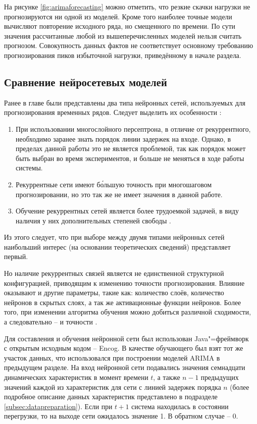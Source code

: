\documentclass[a4paper,14pt,russian]{extreport}
\begin{document}
\newpage
На рисунке \ref{fig:arimaforecasting} можно отметить, что резкие скачки нагрузки 
не прогнозируются ни одной из моделей. Кроме того наиболее точные модели 
вычисляют повторение исходного ряда, но смещенного по времени. По сути 
значения рассчитанные любой из вышеперечисленных моделей нельзя считать 
прогнозом. Совокупность данных фактов не соответствует основному 
требованию прогнозирования пиков избыточной нагрузки, приведённому в 
начале раздела.

\subsection{Сравнение нейросетевых моделей} \label{subsec:nnmodelscompare}
Ранее в главе были представлены два типа нейронных сетей, используемых для 
прогнозирования временных рядов. Следует выделить их особенности 
\cite{chernodub2012}:
\begin{enumerate}
	\item При использовании многослойного персептрона, в отличие от 
		рекуррентного, необходимо заранее знать порядок линии задержек на 
		входе. Однако, в пределах данной работы это не является проблемой, 
		так как порядок может быть выбран во время экспериментов, и 
		больше не меняться в ходе работы системы.
	\item Рекуррентные сети имеют б\'{о}льшую точность при многошаговом 
		прогнозировании, но это так же не имеет значения в данной работе.
	\item Обучение рекуррентных сетей является более трудоемкой задачей, в 
		виду наличия у них дополнительных степеней свободы 
		\cite{medsker2000, naseera2015}.
\end{enumerate}
Из этого следует, что при выборе между двумя типами нейронных сетей 
наибольший интерес (на основании теоретических сведений) представляет 
первый. 

Но наличие рекуррентных связей является не единственной структурной 
конфигурацией, приводящим к изменению точности прогнозирования. Влияние 
оказывают и другие параметры, такие как: количество слоёв, количество  
нейронов в скрытых слоях, а так же активационные функции нейронов. Более  
того, при изменении алгоритма обучения можно добиться различной 
сходимости, а следовательно -- и точности \cite{naseera2015}.

Для составления и обучения нейронной сети был использован Java"=фреймворк 
с открытым исходным кодом -- Encog. В качестве обучающего был взят тот же 
участок данных, что использовался при построении моделей ARIMA в 
предыдущем разделе. На вход нейронной сети подавались значения семнадцати 
динамических характеристик в момент времени $t$, а также $n - 1$ предыдущих 
значений каждой из характеристик для сети с линией задержек порядка $n$ 
(более подробное описание данных характеристик представлено в подразделе 
\ref{subsec:datapreparation}). Если при $t + 1$ система находилась в состоянии 
перегрузки, то на выходе сети ожидалось значение 1. В обратном случае -- 0.
\end{document}
